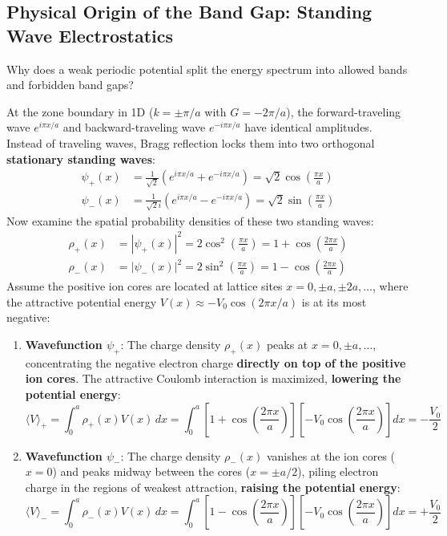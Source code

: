 \documentclass[11pt,a4paper]{article}
\begin{document}
\subsection{Physical Origin of the Band Gap: Standing Wave Electrostatics}
Why does a weak periodic potential split the energy spectrum into allowed bands and forbidden band gaps? 

At the zone boundary in 1D ($k = \pm \pi/a$ with $G = -2\pi/a$), the forward-traveling wave $e^{i\pi x/a}$ and backward-traveling wave $e^{-i\pi x/a}$ have identical amplitudes. Instead of traveling waves, Bragg reflection locks them into two orthogonal \textbf{stationary standing waves}:
\begin{align}
\psi_+(x) &= \frac{1}{\sqrt{2}}\left( e^{i\pi x/a} + e^{-i\pi x/a} \right) = \sqrt{2}\cos\left(\frac{\pi x}{a}\right) \label{eq:psi_plus} \\
\psi_-(x) &= \frac{1}{\sqrt{2}i}\left( e^{i\pi x/a} - e^{-i\pi x/a} \right) = \sqrt{2}\sin\left(\frac{\pi x}{a}\right) \label{eq:psi_minus}
\end{align}
Now examine the spatial probability densities of these two standing waves:
\begin{align}
\rho_+(x) &= |\psi_+(x)|^2 = 2\cos^2\left(\frac{\pi x}{a}\right) = 1 + \cos\left(\frac{2\pi x}{a}\right) \label{eq:rho_plus} \\
\rho_-(x) &= |\psi_-(x)|^2 = 2\sin^2\left(\frac{\pi x}{a}\right) = 1 - \cos\left(\frac{2\pi x}{a}\right) \label{eq:rho_minus}
\end{align}
Assume the positive ion cores are located at lattice sites $x = 0, \pm a, \pm 2a, \dots$, where the attractive potential energy $V(x) \approx -V_0\cos(2\pi x/a)$ is at its most negative:
\begin{enumerate}
    \item \textbf{Wavefunction $\psi_+$}: The charge density $\rho_+(x)$ peaks at $x = 0, \pm a, \dots$, concentrating the negative electron charge \textbf{directly on top of the positive ion cores}. The attractive Coulomb interaction is maximized, \textbf{lowering the potential energy}:
    \begin{equation}
    \langle V \rangle_+ = \int_0^a \rho_+(x) V(x)\,dx = \int_0^a \left[1 + \cos\left(\frac{2\pi x}{a}\right)\right]\left[-V_0\cos\left(\frac{2\pi x}{a}\right)\right]dx = -\frac{V_0}{2}
    \end{equation}
    \item \textbf{Wavefunction $\psi_-$}: The charge density $\rho_-(x)$ vanishes at the ion cores ($x=0$) and peaks midway between the cores ($x = \pm a/2$), piling electron charge in the regions of weakest attraction, \textbf{raising the potential energy}:
    \begin{equation}
    \langle V \rangle_- = \int_0^a \rho_-(x) V(x)\,dx = \int_0^a \left[1 - \cos\left(\frac{2\pi x}{a}\right)\right]\left[-V_0\cos\left(\frac{2\pi x}{a}\right)\right]dx = +\frac{V_0}{2}
    \end{equation}
\end{enumerate}
\end{document}
